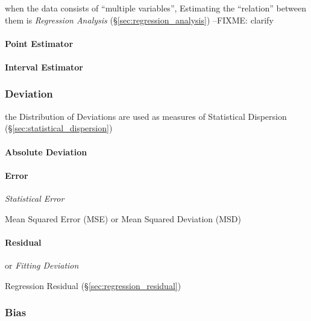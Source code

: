 when the data consists of ``multiple variables'', Estimating the ``relation''
between them is \emph{Regression Analysis} (\S\ref{sec:regression_analysis})
--FIXME: clarify



\paragraph{Point Estimator}\label{sec:point_estimator}\hfill

\paragraph{Interval Estimator}\label{sec:interval_estimator}\hfill



\subsubsection{Deviation}\label{sec:deviation}

\fist the Distribution of Deviations are used as measures of Statistical
Dispersion (\S\ref{sec:statistical_dispersion})



\paragraph{Absolute Deviation}\label{sec:absolute_deviation}\hfill

\paragraph{Error}\label{sec:error}\hfill

\emph{Statistical Error}

Mean Squared Error (MSE) or Mean Squared Deviation (MSD)



\paragraph{Residual}\label{sec:residual}\hfill

or \emph{Fitting Deviation}

\fist Regression Residual (\S\ref{sec:regression_residual})



\subsubsection{Bias}\label{sec:bias}

